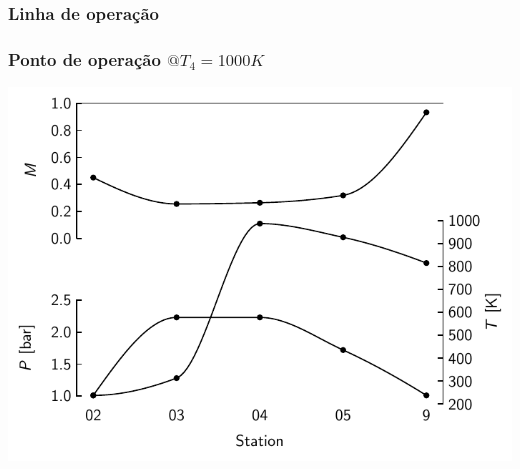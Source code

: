 \documentclass[aspectratio=1610]{beamer}
\begin{document}
\begin{frame}
\frametitle{Linha de operação}
\end{frame}

\begin{frame}
\frametitle{Ponto de operação $@ T_4=1000\si{K}$}
\centering
\includegraphics[width=\paperwidth, height=0.95\textheight, keepaspectratio]{fig/stations1000K}
\end{frame}
\end{document}
